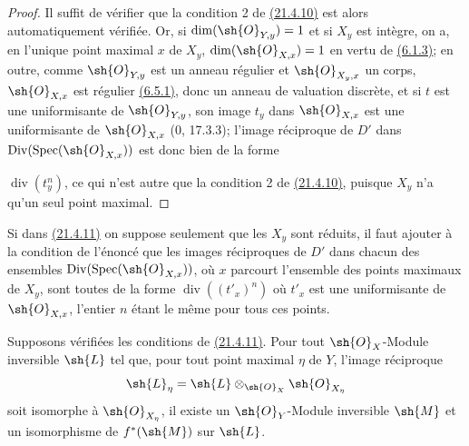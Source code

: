\begin{proof}
Il suffit de vérifier que la condition 2\textdegree{} de
{\hyperlink{ega4.c04.cor.21-4-10}{(21.4.10)}} est alors
automatiquement vérifiée. Or, si $\dim(\sh{O}_{Y,y})=1$ et si $X_y$ est
intègre, on a, en l'unique point maximal $x$ de $X_y$,
$\dim(\sh{O}_{X,x})=1$ en vertu de
{\hyperref[canon-index.ega4.c04.cor.6-1-3]{(6.1.3)}}; en outre, comme
$\sh{O}_{Y,y}$ est un anneau régulier et $\sh{O}_{X_y,x}$ un corps,
$\sh{O}_{X,x}$ est régulier
{\hyperref[canon-index.ega4.c04.prop.6-5-1]{(6.5.1)}}, donc un anneau de valuation
discrète, et si $t$ est une uniformisante de $\sh{O}_{Y,y}$, son image
$t_y$ dans $\sh{O}_{X,x}$ est une uniformisante de $\sh{O}_{X,x}$
($0$, 17.3.3); l'image réciproque de $D'$ dans
$\operatorname{Div}(\operatorname{Spec}(\sh{O}_{X,x}))$ est donc bien
de la forme

$\operatorname{div}(t_y^n)$, ce qui n'est autre que la condition
2\textdegree{} de {\hyperlink{ega4.c04.cor.21-4-10}{(21.4.10)}},
puisque $X_y$ n'a qu'un seul point maximal.
\end{proof}

\begin{remark}[21.4.12]
\label{IV.21.4.12}
Si dans {\hyperlink{ega4.c04.cor.21-4-11}{(21.4.11)}} on suppose
seulement que les $X_y$ sont réduits, il faut ajouter à la condition de
l'énoncé que les images réciproques de $D'$ dans chacun des ensembles
$\operatorname{Div}(\operatorname{Spec}(\sh{O}_{X,x}))$, où $x$
parcourt l'ensemble des points maximaux de $X_y$, sont toutes de la
forme $\operatorname{div}((t'_x)^n)$ où $t'_x$ est une uniformisante
de $\sh{O}_{X,x}$, l'entier $n$ étant le même pour tous ces points.
\end{remark}

\begin{corollary}[21.4.13]
\label{IV.21.4.13}
Supposons vérifiées les conditions de
{\hyperlink{ega4.c04.cor.21-4-11}{(21.4.11)}}. Pour tout
$\sh{O}_X$-Module inversible $\sh{L}$ tel que, pour tout point maximal
$\eta$ de $Y$, l'image réciproque
\[
 \sh{L}_\eta=\sh{L}\otimes_{\sh{O}_X}\sh{O}_{X_\eta}
\]
soit isomorphe à $\sh{O}_{X_\eta}$, il existe un
$\sh{O}_Y$-Module inversible $\sh{M}$ et un isomorphisme de
$f^*(\sh{M})$ sur $\sh{L}$.
\end{corollary}

